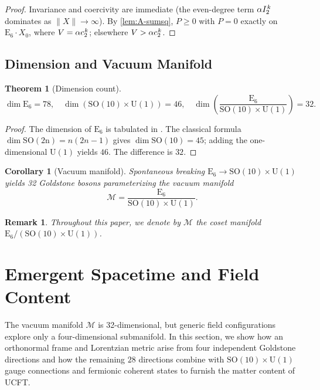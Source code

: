 \documentclass[pdflatex,sn-mathphys-num]{sn-jnl}
\theoremstyle{thmstyleone}
\newtheorem{theorem}{Theorem}
\newtheorem{corollary}{Corollary}
\theoremstyle{thmstyletwo}%
\newtheorem{remark}{Remark}%
\theoremstyle{thmstylethree}%
\newcommand{\SO}[1]{\mathrm{SO(#1)}}
\newcommand{\U}[1]{\mathrm{U(#1)}}
\newcommand{\E}[1]{\mathrm{E_{#1}}}
\newcommand{\M}{\mathcal{M}}
\newcommand{\SOTen}{\SO{10}}
\newcommand{\UOne}{\U{1}}
\newcommand{\ESix}{\E{6}}
\newcommand{\SOTenXUOne}{\SOTen \times \UOne}
\newcommand{\MCoset}{\frac{\ESix}{\SOTenXUOne}}
\newcommand{\sm}{\hspace{.065em}}
\newcommand{\smexp}[1]{^{\sm #1}}
\begin{document}
\begin{proof}
Invariance and coercivity are immediate (the even-degree term
$\alpha I_{2}\smexp{k}$ dominates as $\|X\|\to\infty$).
By \autoref{lem:A-sumsq}, $P\ge0$ with $P=0$ exactly on $\ESix\cdot X_{0}$,
where $V=\alpha c_{2}\smexp{k}$; elsewhere $V>\alpha c_{2}\smexp{k}$.
\end{proof}

\subsection{Dimension and Vacuum Manifold}\label{subsec:Vacuum}
\begin{theorem}[Dimension count]\label{thm:DimCount}
\[
  \dim \ESix=78,
  \quad
  \dim (\SOTenXUOne)=46,
  \quad
  \dim \left(\MCoset\right)=32.
\]
\end{theorem}

\begin{proof}
The dimension of $\ESix$ is tabulated in \cite{Slansky:1981}.  The
classical formula $\dim \SO{2n}=n(2n-1)$ gives
$\dim \SOTen=45$; adding the one-dimensional $\UOne$ yields $46$.  The
difference is $32$.
\end{proof}

\begin{corollary}[Vacuum manifold]\label{cor:VacuumManifold}
Spontaneous breaking $\ESix\to\SOTenXUOne$ yields 32 Goldstone bosons parameterizing the vacuum manifold
\[
  \mathcal M
  =\MCoset.
\]
\end{corollary}

\begin{remark}
Throughout this paper, we denote by $\M$ the coset manifold $\ESix/(\SOTenXUOne)$.
\end{remark}

\section{Emergent Spacetime and Field Content}
\label{sec:EmergentFields}
The vacuum manifold $\M$ is 32-dimensional, but generic field configurations
explore only a four-dimensional submanifold. In this section, we show how an
orthonormal frame and Lorentzian metric arise from four independent Goldstone
directions and how the remaining $28$ directions combine with $\SOTenXUOne$ gauge
connections and fermionic coherent states to furnish the matter content of UCFT.
\end{document}
